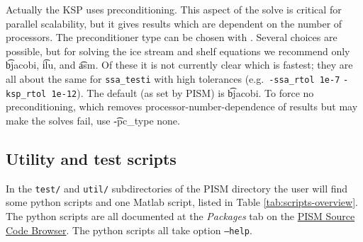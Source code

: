 Actually the KSP uses preconditioning.  This aspect of the solve is critical for parallel scalability, but it gives results which are dependent on the number of processors.  The preconditioner type can be chosen with . Several choices are possible, but for solving the ice stream and shelf equations we recommend only \t{bjacobi}, \t{ilu}, and \t{asm}.  Of these it is not currently clear which is fastest; they are all about the same for \texttt{ssa_testi} with high tolerances (e.g.~\texttt{-ssa_rtol 1e-7} \texttt{-ksp_rtol 1e-12}).  The default (as set by PISM) is \t{bjacobi}.  To force no preconditioning, which removes processor-number-dependence of results but may make the solves fail, use \t{-pc_type none}.


\subsection{Utility and test scripts} \label{subsect:scripts} In the \verb|test/| and \verb|util/| subdirectories of the PISM directory the user will find some python scripts and one Matlab script, listed in Table \ref{tab:scripts-overview}.  The python scripts are all documented at the \textsl{Packages} tab on the \href{http://www.pism-docs.org/doxy/html/index.html}{PISM Source Code Browser}.  The python scripts all take option \texttt{--help}.

\newcommand{\scripthead}[1]{\texttt{#1}}

